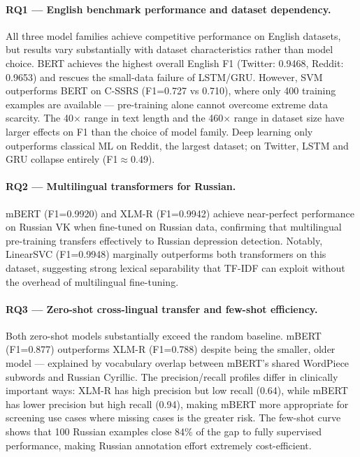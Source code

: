 \documentclass[12pt, a4paper, oneside]{report}
\begin{document}
\paragraph{RQ1 — English benchmark performance and dataset dependency.}
All three model families achieve competitive performance on English datasets, but results vary substantially with dataset characteristics rather than model choice. BERT achieves the highest overall English F1 (Twitter: 0.9468, Reddit: 0.9653) and rescues the small-data failure of LSTM/GRU. However, SVM outperforms BERT on C-SSRS (F1=0.727 vs 0.710), where only 400 training examples are available — pre-training alone cannot overcome extreme data scarcity. The 40$\times$ range in text length and the 460$\times$ range in dataset size have larger effects on F1 than the choice of model family. Deep learning only outperforms classical ML on Reddit, the largest dataset; on Twitter, LSTM and GRU collapse entirely (F1$\approx$0.49).

\paragraph{RQ2 — Multilingual transformers for Russian.}
mBERT (F1=0.9920) and XLM-R (F1=0.9942) achieve near-perfect performance on Russian VK when fine-tuned on Russian data, confirming that multilingual pre-training transfers effectively to Russian depression detection. Notably, LinearSVC (F1=0.9948) marginally outperforms both transformers on this dataset, suggesting strong lexical separability that TF-IDF can exploit without the overhead of multilingual fine-tuning.

\paragraph{RQ3 — Zero-shot cross-lingual transfer and few-shot efficiency.}
Both zero-shot models substantially exceed the random baseline. mBERT (F1=0.877) outperforms XLM-R (F1=0.788) despite being the smaller, older model — explained by vocabulary overlap between mBERT's shared WordPiece subwords and Russian Cyrillic. The precision/recall profiles differ in clinically important ways: XLM-R has high precision but low recall (0.64), while mBERT has lower precision but high recall (0.94), making mBERT more appropriate for screening use cases where missing cases is the greater risk. The few-shot curve shows that 100 Russian examples close 84\% of the gap to fully supervised performance, making Russian annotation effort extremely cost-efficient.
\end{document}
